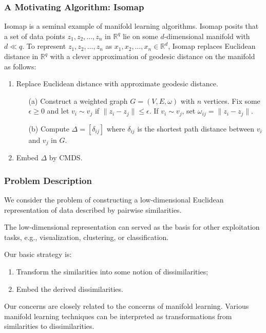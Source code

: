\documentclass[professionalfonts, hyperref={pdfpagelabels=false,
  colorlinks=true, linkcolor=purple}]{beamer}
\begin{document}
\begin{frame}
  \frametitle{A Motivating Algorithm: Isomap} 
  Isomap \cite{tenebaum00:_global_geomet_framew_nonlin_dimen_reduc} is
  a seminal example of manifold learning algorithms. Isomap posits that
  a set of data points $z_1, z_2, \dots, z_n$ in $\mathbb{R}^{q}$ lie
  on some $d$-dimensional manifold with $d \ll q$. To represent $z_1, z_2,
  \dots, z_n$ as $x_1, x_2, \dots, x_n \in \mathbb{R}^{d}$, Isomap
  replaces Euclidean distance in $\mathbb{R}^{q}$ with a clever
  approximation of geodesic distance on the manifold as follows:
  \vskip10pt
  \begin{enumerate}
  \item Replace Euclidean distance with approximate geodesic
    distance.
    \begin{enumerate}
    \item[(a)] Construct a weighted graph $G = (V,E,\omega)$ with $n$
      vertices. Fix some $\epsilon \geq 0$ and let $v_i \sim v_j$ if 
      $\|z_i - z_j\| \leq \epsilon$. If $v_i \sim v_j$, set
      $\omega_{ij} = \|z_i - z_j\|$.
    \item[(b)] Compute $\Delta = [\delta_{ij}]$ where
      $\delta_{ij}$ is the shortest path distance between $v_i$ and
      $v_j$ in $G$.
    \end{enumerate}
   \item Embed $\Delta$ by CMDS.
  \end{enumerate}
\end{frame}

\begin{frame}
  \frametitle{Problem Description}
  We consider the problem of constructing a low-dimensional Euclidean
  representation of data described by pairwise similarities. 
  
 \vskip10pt The low-dimensional representation can served as the basis
 for other exploitation tasks, e.g., visualization, clustering, or 
 classification.  
 
 \vskip10pt Our basic strategy is:

  \begin{enumerate}
  \item Transform the similarities into some notion of dissimilarities;
  \item Embed the derived dissimilarities.
  \end{enumerate}
  
  Our concerns are closely related to the concerns of \alert{manifold
    learning}. Various manifold learning techniques can be interpreted
  as transformations from similarities to dissimilarities.
\end{frame}
\end{document}
